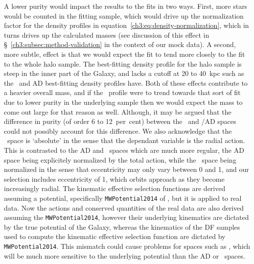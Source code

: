 A lower purity would impact the results to the fits in two ways. First, more stars would be counted in the fitting sample, which would drive up the normalization factor for the density profiles in equation~\eqref{ch3:eq:density-normalization}, which in turns drives up the calculated masses (see discussion of this effect in \S~\ref{ch3:subsec:method-validation} in the context of our mock data). A second, more subtle, effect is that we would expect the fit to tend more closely to the fit to the whole halo sample. The best-fitting density profile for the halo sample is steep in the inner part of the Galaxy, and lacks a cutoff at 20 to 40~kpc such as the \eLz\ and AD best-fitting density profiles have. Both of these effects contribute to a heavier overall mass, and if the \JRLz\ profile were to trend towards that sort of fit due to lower purity in the underlying sample then we would expect the mass to come out large for that reason as well. Although, it may be argued that the difference in purity (of order 6 to 12~per~cent) between the \JRLz\ and \eLz/AD spaces could not possibly account for this difference. We also acknowledge that the \JRLz\ space is `absolute' in the sense that the dependant variable is the radial action. This is contrasted to the AD and \eLz\ spaces which are much more regular, the AD space being explicitely normalized by the total action, while the \eLz\ space being normalized in the sense that eccentricity may only vary between 0 and 1, and our selection includes eccentricity of 1, which orbits approach as they become increasingly radial. The kinematic effective selection functions are derived assuming a potential, specifically \texttt{MWPotential2014} of \textcite{bovy15}, but it is applied to real data. Now the actions and conserved quantities of the real data are also derived assuming the \texttt{MWPotential2014}, however their underlying kinematics are dictated by the true potential of the Galaxy, whereas the kinematics of the DF samples used to compute the kinematic effective selection function are dictated by \texttt{MWPotential2014}. This mismatch could cause problems for spaces such as \JRLz, which will be much more sensitive to the underlying potential than the AD or \eLz\ spaces.

